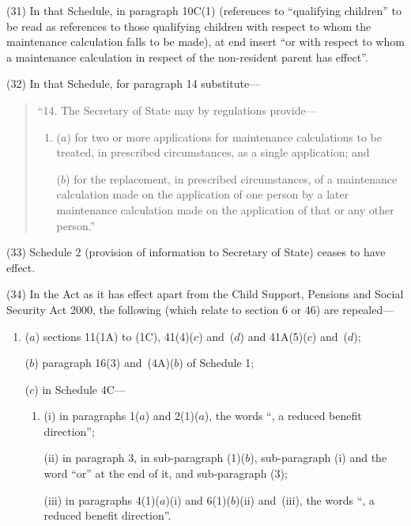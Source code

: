\documentclass[12pt,a4paper]{article}
\begin{document}
(31) In that Schedule, in paragraph 10C(1) (references to “qualifying children” to be read as references to those qualifying children with respect to whom the maintenance calculation falls to be made), at end insert  “or with respect to whom a maintenance calculation in respect of the non-resident parent has effect”.

(32) In that Schedule, for paragraph 14 substitute—
\begin{quotation}
“14. The Secretary of State may by regulations provide—
\begin{enumerate}\item[]
($a$) for two or more applications for maintenance calculations to be treated, in prescribed circumstances, as a single application; and

($b$) for the replacement, in prescribed circumstances, of a maintenance calculation made on the application of one person by a later maintenance calculation made on the application of that or any other person.”
\end{enumerate}
\end{quotation}

(33) Schedule 2 (provision of information to Secretary of State) ceases to have effect.

(34) In the Act as it has effect apart from the Child Support, Pensions and Social Security Act 2000, the following (which relate to section 6 or 46) are repealed—
\begin{enumerate}\item[]
($a$) sections 11(1A) to (1C), 41(4)($c$) and~($d$) and 41A(5)($c$) and~($d$);

($b$) paragraph 16(3) and~(4A)($b$) of Schedule 1;

($c$) in Schedule 4C—
\begin{enumerate}\item[]
(i) in paragraphs 1($a$) and 2(1)($a$), the words “, a reduced benefit direction”;

(ii) in paragraph 3, in sub-paragraph (1)($b$), sub-paragraph (i) and the word “or” at the end of it, and sub-paragraph (3);

(iii) in paragraphs 4(1)($a$)(i) and 6(1)($b$)(ii) and~(iii), the words “, a reduced benefit direction”.
\end{enumerate}
\end{enumerate}

\end{document}
